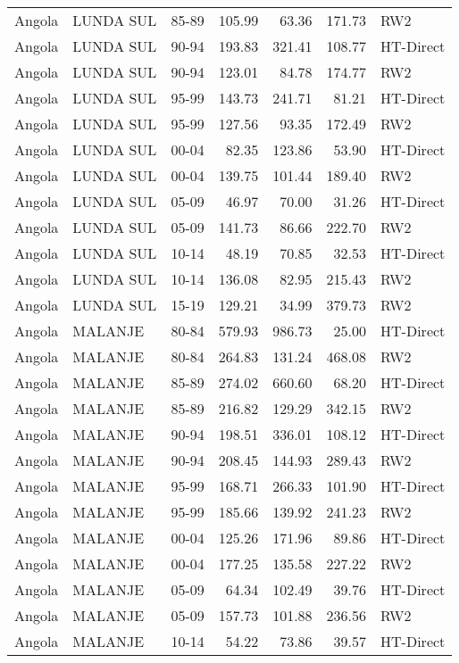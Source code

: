 \begin{longtable}{lllrrrl}
  Angola & LUNDA SUL & 85-89 & 105.99 & 63.36 & 171.73 & RW2 \\ 
  Angola & LUNDA SUL & 90-94 & 193.83 & 321.41 & 108.77 & HT-Direct \\ 
  Angola & LUNDA SUL & 90-94 & 123.01 & 84.78 & 174.77 & RW2 \\ 
  Angola & LUNDA SUL & 95-99 & 143.73 & 241.71 & 81.21 & HT-Direct \\ 
  Angola & LUNDA SUL & 95-99 & 127.56 & 93.35 & 172.49 & RW2 \\ 
  Angola & LUNDA SUL & 00-04 & 82.35 & 123.86 & 53.90 & HT-Direct \\ 
  Angola & LUNDA SUL & 00-04 & 139.75 & 101.44 & 189.40 & RW2 \\ 
  Angola & LUNDA SUL & 05-09 & 46.97 & 70.00 & 31.26 & HT-Direct \\ 
  Angola & LUNDA SUL & 05-09 & 141.73 & 86.66 & 222.70 & RW2 \\ 
  Angola & LUNDA SUL & 10-14 & 48.19 & 70.85 & 32.53 & HT-Direct \\ 
  Angola & LUNDA SUL & 10-14 & 136.08 & 82.95 & 215.43 & RW2 \\ 
  Angola & LUNDA SUL & 15-19 & 129.21 & 34.99 & 379.73 & RW2 \\ 
  Angola & MALANJE & 80-84 & 579.93 & 986.73 & 25.00 & HT-Direct \\ 
  Angola & MALANJE & 80-84 & 264.83 & 131.24 & 468.08 & RW2 \\ 
  Angola & MALANJE & 85-89 & 274.02 & 660.60 & 68.20 & HT-Direct \\ 
  Angola & MALANJE & 85-89 & 216.82 & 129.29 & 342.15 & RW2 \\ 
  Angola & MALANJE & 90-94 & 198.51 & 336.01 & 108.12 & HT-Direct \\ 
  Angola & MALANJE & 90-94 & 208.45 & 144.93 & 289.43 & RW2 \\ 
  Angola & MALANJE & 95-99 & 168.71 & 266.33 & 101.90 & HT-Direct \\ 
  Angola & MALANJE & 95-99 & 185.66 & 139.92 & 241.23 & RW2 \\ 
  Angola & MALANJE & 00-04 & 125.26 & 171.96 & 89.86 & HT-Direct \\ 
  Angola & MALANJE & 00-04 & 177.25 & 135.58 & 227.22 & RW2 \\ 
  Angola & MALANJE & 05-09 & 64.34 & 102.49 & 39.76 & HT-Direct \\ 
  Angola & MALANJE & 05-09 & 157.73 & 101.88 & 236.56 & RW2 \\ 
  Angola & MALANJE & 10-14 & 54.22 & 73.86 & 39.57 & HT-Direct \\ 

\end{longtable}

